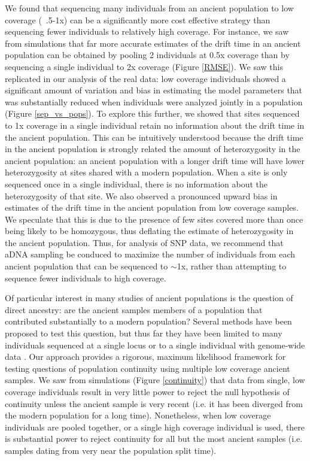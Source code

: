 \documentclass[11pt, oneside]{article}   	%
\begin{document}
We found that sequencing many individuals from an ancient population to low coverage (~.5-1x) can be a significantly more cost effective strategy than sequencing fewer individuals to relatively high coverage. For instance, we saw from simulations that far more accurate estimates of the drift time in an ancient population can be obtained by pooling 2 individuals at 0.5x coverage than by sequencing a single individual to 2x coverage (Figure \ref{RMSE}). We saw this replicated in our analysis of the real data: low coverage individuals showed a significant amount of variation and bias in estimating the model parameters that was substantially reduced when individuals were analyzed jointly in a population (Figure \ref{sep_vs_pops}). To explore this further, we showed that sites sequenced to 1x coverage in a single individual retain no information about the drift time in the ancient population. This can be intuitively understood because the drift time in the ancient population is strongly related the amount of heterozygosity in the ancient population: an ancient population with a longer drift time will have lower heterozygosity at sites shared with a modern population. When a site is only sequenced once in a single individual, there is no information about the heterozygosity of that site. We also observed a pronounced upward bias in estimates of the drift time in the ancient population from low coverage samples. We speculate that this is due to the presence of few sites covered more than once being likely to be homozygous, thus deflating the estimate of heterozygosity in the ancient population. Thus, for analysis of SNP data, we recommend that aDNA sampling be conduced to maximize the number of individuals from each ancient population that can be sequenced to $\sim$1x, rather than attempting to sequence fewer individuals to high coverage.

Of particular interest in many studies of ancient populations is the question of direct ancestry: are the ancient samples members of a population that contributed substantially to a modern population? Several methods have been proposed to test this question, but thus far they have been limited to many individuals sequenced at a single locus \citep{sjodin2014assessing} or to a single individual with genome-wide data \citep{rasmussen2014genome}. Our approach provides a rigorous, maximum likelihood framework for testing questions of population continuity using multiple low coverage ancient samples. We saw from simulations (Figure \ref{continuity}) that data from single, low coverage individuals result in very little power to reject the null hypothesis of continuity unless the ancient sample is very recent (i.e. it has been diverged from the modern population for a long time). Nonetheless, when low coverage individuals are pooled together, or a single high coverage individual is used, there is substantial power to reject continuity for all but the most ancient samples (i.e. samples dating from very near the population split time).
\end{document}
